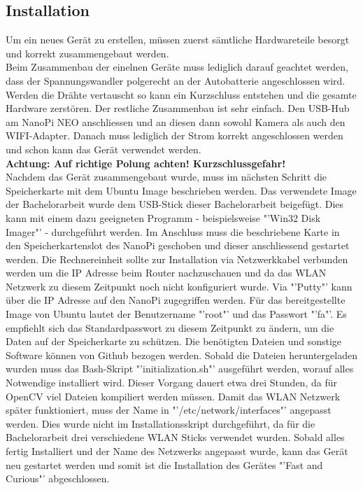 \subsection{Installation}
Um ein neues Gerät zu erstellen, müssen zuerst sämtliche Hardwareteile besorgt und korrekt zusammengebaut werden.\\

Beim Zusammenbau der einelnen Geräte muss lediglich darauf geachtet werden, dass der Spannungswandler polgerecht an der Autobatterie angeschlossen wird. Werden die Drähte vertauscht so kann ein Kurzschluss entstehen und die gesamte Hardware zerstören. Der restliche Zusammenbau ist sehr einfach. Den USB-Hub am NanoPi NEO anschliessen und an diesen dann sowohl Kamera als auch den WIFI-Adapter. Danach muss lediglich der Strom korrekt angeschlossen werden und schon kann das Gerät verwendet werden.\\
\textbf{Achtung: Auf richtige Polung achten! Kurzschlussgefahr!}\\

Nachdem das Gerät zusammengebaut wurde, muss im nächsten Schritt die Speicherkarte mit dem Ubuntu Image beschrieben werden. Das verwendete Image der Bachelorarbeit wurde dem USB-Stick dieser Bachelorarbeit beigefügt. Dies kann mit einem dazu geeigneten Programm - beispielsweise "'Win32 Disk Imager"' - durchgeführt werden. Im Anschluss muss die beschriebene Karte in den Speicherkartenslot des NanoPi geschoben und dieser anschliessend gestartet werden. Die Rechnereinheit sollte zur Installation via Netzwerkkabel verbunden werden um die IP Adresse beim Router nachzuschauen und da das WLAN Netzwerk zu diesem Zeitpunkt noch nicht konfiguriert wurde. Via "'Putty"' kann über die IP Adresse auf den NanoPi zugegriffen werden. Für das bereitgestellte Image von Ubuntu lautet der Benutzername "'root"' und das Passwort "'fa"'. Es empfiehlt sich das Standardpasswort zu diesem Zeitpunkt zu ändern, um die Daten auf der Speicherkarte zu schützen. Die benötigten Dateien und sonstige Software können von Github bezogen werden. Sobald die Dateien heruntergeladen wurden muss das Bash-Skript "'initialization.sh"' ausgeführt werden, worauf alles Notwendige installiert wird. Dieser Vorgang dauert etwa drei Stunden, da für OpenCV viel Dateien kompiliert werden müssen.
Damit das WLAN Netzwerk später funktioniert, muss der Name in "'/etc/network/interfaces"' angepasst werden. Dies wurde nicht im Installationsskript durchgeführt, da für die Bachelorarbeit drei verschiedene WLAN Sticks verwendet wurden. Sobald alles fertig Installiert und der Name des Netzwerks angepasst wurde, kann das Gerät neu gestartet werden und somit ist die Installation des Gerätes "'Fast and Curious"' abgeschlossen.